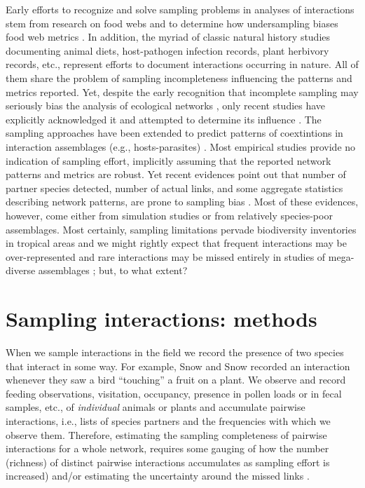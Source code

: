 \documentclass[12pt]{article}
\begin{document}
Early efforts to recognize and solve sampling problems in analyses of interactions stem from research on food webs and to determine how undersampling biases food web metrics \citep{Martinez:1991aa,Cohen:1993aa,Martinez:1993ti,Bersier:2002p9371,Brose:2003wv,BanasekRichter:2004ik,Wells:2012dy}. In addition, the myriad of classic natural history studies documenting animal diets, host-pathogen infection records, plant herbivory records, etc., represent efforts to document interactions occurring in nature. All of them share the problem of sampling incompleteness influencing the patterns and metrics reported. Yet, despite the early recognition that incomplete sampling may seriously bias the analysis of ecological networks \citep{E31/2562}, only recent studies have explicitly acknowledged it and attempted to determine its influence \citep{Ollerton:2002jw,Nielsen:2007,Vazquez:2009p82,Gibson:2011eh,Olesen:2011a,Chacoff:2012,RiveraHutinel:2012vn,Olito:2014gc,Bascompte:2014to,Vizentin-Bugoni:2014hc,Frund:2015ii}. The sampling approaches have been extended to predict patterns of coextintions in interaction assemblages (e.g., hosts-parasites) \citep{Colwell:2012fc}. Most empirical studies provide no indication of sampling effort, implicitly assuming that the reported network patterns and metrics are robust. Yet recent evidences point out that number of partner species detected, number of actual links, and some aggregate statistics describing network patterns, are prone to sampling bias \citep{Nielsen:2007,Dorado:2011cf,Olesen:2011a,Chacoff:2012,RiveraHutinel:2012vn,Olito:2014gc,Frund:2015ii}. Most of these evidences, however, come either from simulation studies \citep{Frund:2015ii} or from relatively species-poor assemblages. Most certainly, sampling limitations pervade biodiversity inventories in tropical areas \citep{Coddington:2009fi} and we might rightly expect that frequent interactions may be over-represented and rare interactions may be missed entirely in studies of mega-diverse assemblages \citep{Bascompte:2014to}; but, to what extent? 

\section*{Sampling interactions: methods}
\label{samplinginteractions:methods}
When we sample interactions in the field we record the presence of two species that interact in some way. For example, Snow and Snow\citeyearpar{Snow:1988iu} recorded an interaction whenever they saw a bird ``touching'' a fruit on a plant. We observe and record feeding observations, visitation, occupancy, presence in pollen loads or in fecal samples, etc., of \emph{individual} animals or plants and accumulate pairwise interactions, i.e., lists of species partners and the frequencies with which we observe them. Therefore, estimating the sampling completeness of pairwise interactions for a whole network, requires some gauging of how the number (richness) of distinct pairwise interactions accumulates as sampling effort is increased) and/or estimating the uncertainty around the missed links \citep{Wells:2012dy}. 
\end{document}
